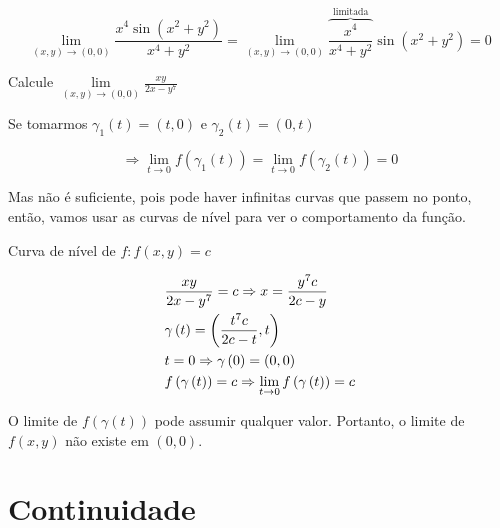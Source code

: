 \documentclass[11pt, oneside, a4paper]{gsm-l}
\begin{document}
\begin{sol}
\[
\mathop {\lim }\limits_{\left( {x,y} \right) \to \left( {0,0} \right)} \frac{{x^4 \sin \left( {x^2  + y^2 } \right)}}
{{x^4  + y^2 }} = \mathop {\lim }\limits_{\left( {x,y} \right) \to \left( {0,0} \right)} \overbrace {\frac{{x^4 }}
{{x^4  + y^2 }}}^{{\text{limitada}}}\sin \left( {x^2  + y^2 } \right) = 0
\]

\end{sol}

\begin{exem}
    Calcule $\mathop {\lim }\limits_{\left( {x,y} \right) \to \left( {0,0} \right)} \frac{{xy}}
{{2x - y^7 }}$
\end{exem}

\begin{sol}
    Se tomarmos $\gamma _1 \left( t \right) = \left( {t,0} \right)$ e $\gamma _2 \left( t \right) = \left( {0,t} \right)$

\[
     \Rightarrow \mathop {\lim }\limits_{t \to 0} f\left( {\gamma _1 \left( t \right)} \right) = \mathop {\lim }\limits_{t \to 0} f\left( {\gamma _2 \left( t \right)} \right) = 0
\]

    Mas não é suficiente, pois pode haver infinitas curvas que passem no ponto, então, vamos usar as curvas de nível para ver o comportamento da função.

Curva de nível de $f: f(x,y)=c$

\[
\begin{gathered}
\frac{{xy}}
{{2x - y^7 }} = c \Rightarrow x = \frac{{y^7 c}}
{{2c - y}} \hfill \\
\gamma \left( t \right) = \left( {\frac{{t^7 c}}
{{2c - t}},t} \right) \hfill \\
t = 0 \Rightarrow \gamma \left( 0 \right) = \left( {0,0} \right) \hfill \\
  f\left( {\gamma \left( t \right)} \right) = c \Rightarrow \mathop {\lim }\limits_{t \to 0} f\left( {\gamma \left( t \right)} \right) = c \hfill \\
\end{gathered}
\]

    O limite de $f\left( {\gamma \left( t \right)} \right)$ pode assumir qualquer valor. Portanto, o limite de $f(x,y)$ não existe em $(0,0)$.
\end{sol}

\section{Continuidade} \label{sec11}
\end{document}
